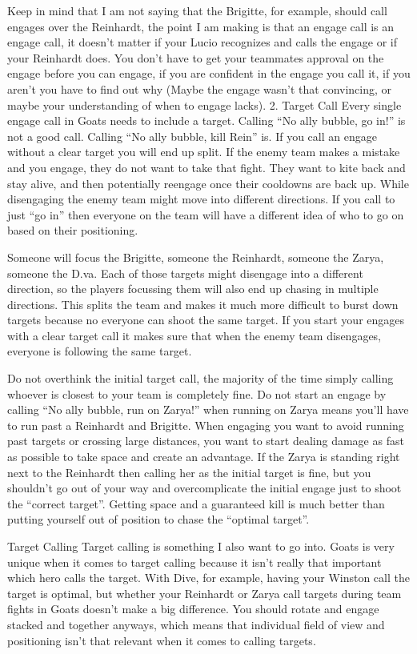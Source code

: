 Keep in mind that I am not saying that the Brigitte, for example, should call engages over the Reinhardt, the point I am making is that an engage call is an engage call, it doesn’t matter if your Lucio recognizes and calls the engage or if your Reinhardt does. You don’t have to get your teammates approval on the engage before you can engage, if you are confident in the engage you call it, if you aren’t you have to find out why (Maybe the engage wasn’t that convincing, or maybe your understanding of when to engage lacks).
2. Target Call
    Every single engage call in Goats needs to include a target. Calling “No ally bubble, go in!” is not a good call. Calling “No ally bubble, kill Rein” is. If you call an engage without a clear target you will end up split. If the enemy team makes a mistake and you engage, they do not want to take that fight. They want to kite back and stay alive, and then potentially reengage once their cooldowns are back up. While disengaging the enemy team might move into different directions. If you call to just “go in” then everyone on the team will have a  different idea of who to go on based on their positioning.

Someone will focus the Brigitte, someone the Reinhardt, someone the Zarya, someone the D.va. Each of those targets might disengage into a different direction, so the players focussing them will also end up chasing in multiple directions. This splits the team and makes it much more difficult to burst down targets because no everyone can shoot the same target. If you start your engages with a clear target call it makes sure that when the enemy team disengages, everyone is following the same target.

Do not overthink the initial target call, the majority of the time simply calling whoever is closest to your team is completely fine. Do not start an engage by calling “No ally bubble, run on Zarya!” when running on Zarya means you’ll have to run past a Reinhardt and Brigitte. When engaging you want to avoid running past targets or crossing large distances, you want to start dealing damage as fast as possible to take space and create an advantage. If the Zarya is standing right next to the Reinhardt then calling her as the initial target is fine, but you shouldn’t go out of your way and overcomplicate the initial engage just to shoot the “correct target”.  Getting space and a guaranteed kill is much better than putting yourself out of position to chase the “optimal target”.

Target Calling
Target calling is something I also want to go into. Goats is very unique when it comes to target calling because it isn’t really that important which hero calls the target. With Dive, for example, having your Winston call the target is optimal, but whether your Reinhardt or Zarya call targets during team fights in Goats doesn’t make a big difference. You should rotate and engage stacked and together anyways, which means that individual field of view and positioning isn’t that relevant when it comes to calling targets.

